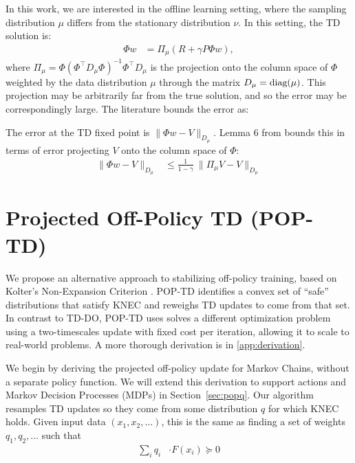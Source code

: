 In this work, we are interested in the offline learning setting, where the sampling distribution $\mu$ differs from the stationary distribution $\nu$.
In this setting, the TD solution is:
\begin{align}
  \Phi w & = \Pi_{\mu} (R + \gamma P \Phi w) ,
\end{align}
where $\Pi_\mu = \Phi(\Phi^\top D_{\mu} \Phi)^{-1}\Phi^\top D_{\mu}$ is the projection onto the column space of $\Phi$ weighted by the data distribution $\mu$ through the matrix $D_{\mu} = \text{diag}(\mu)$. This projection may be arbitrarily far from the true solution, and so the error may be correspondingly large. The literature bounds the error as:
\begin{theorem}
The error at the TD fixed point is $\|\Phi w - V \|_{D_\mu}$. Lemma 6 from \cite{tsitsiklis1996analysis} bounds this in terms of error projecting $V$ onto the column space of $\Phi$:
\begin{align}
    \|\Phi w - V \|_{D_\mu} & \leq \frac{1}{1-\gamma} ~ \| \Pi_{\mu} V - V \|_{D_\mu} 
\end{align} \label{thm:boundTDError}
\end{theorem}


\section{Projected Off-Policy TD (POP-TD) }

We propose an alternative approach to stabilizing off-policy training, based on Kolter's Non-Expansion Criterion \citep{kolter2011fixed}. POP-TD identifies a convex set of ``safe'' distributions that satisfy KNEC and reweighs TD updates to come from that set. In contrast to TD-DO, POP-TD uses solves a different optimization problem using a two-timescales update with fixed cost per iteration, allowing it to scale to real-world problems. A more thorough derivation is in \cref{app:derivation}.

We begin by deriving the projected off-policy update for Markov Chains, without a separate policy function. We will extend this derivation to support actions and Markov Decision Processes (MDPs) in Section~\ref{sec:popq}. Our algorithm resamples TD updates so they come from some distribution $q$ for which KNEC holds. Given input data $(x_1, x_2, \ldots)$, this is the same as finding a set of weights $q_1, q_2, \ldots$ such that
\begin{align}
  \sum_i q_i & \cdot F(x_i) \succcurlyeq 0
\end{align}

